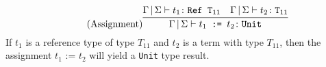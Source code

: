 \begin{equation*}
    \tag{Assignment}
    \infer{
        \Gamma\,|\,\Sigma \vdash t_1 \texttt{ := } t_2 \colon \texttt{Unit}
    }{
        \Gamma\,|\,\Sigma \vdash t_1 \colon \texttt{Ref T}_{11}
        &
        \Gamma\,|\,\Sigma \vdash t_2 \colon \texttt{T}_{11}
    }
\end{equation*}
If $t_1$ is a reference type of type $T_{11}$ and $t_2$ is a term
with type $T_{11}$, then the assignment $t_1 \texttt{ := } t_2$ will
yield a \texttt{Unit} type result.
